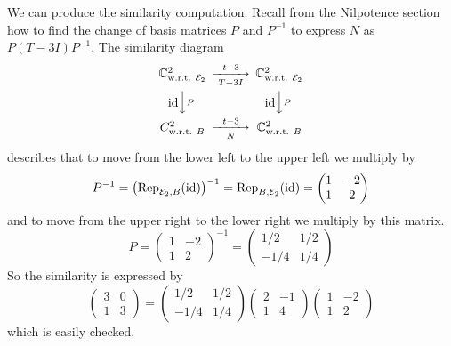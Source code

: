 \begin{example}
We can produce the similarity computation.
Recall from the Nilpotence section how to find the change of
basis matrices $P$ and $P^{-1}$ to express \( N \) as \( P(T-3I)P^{-1} \).
The similarity diagram
\begin{equation*}
  \begin{CD}
    \C^2_\wrt{\stdbasis_2}      @>t-3>T-3I>      \C^2_\wrt{\stdbasis_2}     \\
    @V\scriptstyle\identity V\scriptstyle PV  
                                 @V\scriptstyle\identity V\scriptstyle PV \\
    C^2_\wrt{B}                 @>t-3>N>         \C^2_\wrt{B}
  \end{CD}
\end{equation*}
describes that to move from the lower left to the upper left we multiply by
\begin{equation*}
  P^{-1}=\bigl({\rm Rep}_{{\cal E}_2,B}(\mbox{id})\bigr)^{-1}
    ={\rm Rep}_{B,{\cal E}_2}(\mbox{id})
    =\begin{pmatrix}
        1  &-2  \\
        1  &2
     \end{pmatrix}
\end{equation*}
and to move from the upper right to the lower right we multiply by
this matrix.
\begin{equation*}
  P=\begin{pmatrix}
      1  &-2  \\
      1  &2
     \end{pmatrix}^{-1}
   =\begin{pmatrix}
      1/2  &1/2  \\
      -1/4 &1/4
   \end{pmatrix}
\end{equation*}
So the similarity is expressed by
\begin{equation*}
  \begin{pmatrix}
     3  &0  \\
     1  &3
  \end{pmatrix}
  =
  \begin{pmatrix}
      1/2  &1/2  \\
      -1/4 &1/4
   \end{pmatrix}
   \begin{pmatrix}
      2  &-1  \\
      1  &4
    \end{pmatrix}
    \begin{pmatrix}
        1  &-2  \\
        1  &2
     \end{pmatrix}
\end{equation*}
which is easily checked.
\end{example}


